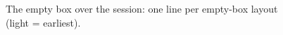\begin{figure}[t]
\centering

\caption{The empty box over the session: one line per empty-box layout (light = earliest).}
\label{fig:empty_box_session}
\end{figure}
